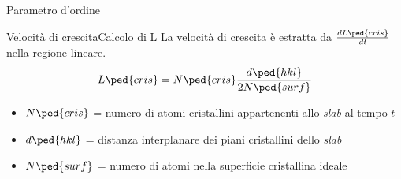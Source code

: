 \documentclass{beamer}
\begin{document}
\begin{frame}{Parametro d'ordine}

\end{frame}

\begin{frame}{Velocità di crescita}{Calcolo di L}
 La velocità di crescita è estratta da $\frac{dL\ped{cris}}{dt}$ nella regione lineare.
 \begin{equation*}
 	L\ped{cris}= N\ped{cris} \frac{d\ped{hkl}}{2 N\ped{surf}}	
 \end{equation*}
 \begin{itemize}
 	\item $N\ped{cris}$ = numero di atomi cristallini appartenenti allo \emph{slab} al tempo $t$
 	\item $d\ped{hkl}$ = distanza interplanare dei piani cristallini dello \emph{slab}
 	\item $N\ped{surf}$ = numero di atomi nella superficie cristallina ideale
 \end{itemize}	
\end{frame}
\end{document}
